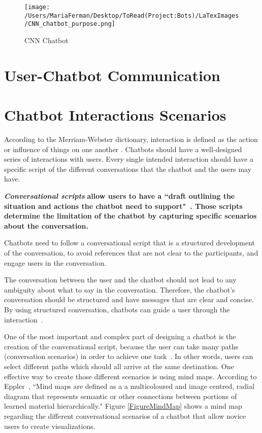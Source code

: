 \documentclass[a4paper,10pt]{article}
\begin{document}
\begin{figure}
\centering
\texttt{[image: /Users/MariaFerman/Desktop/ToRead(Project:Bots)/LaTexImages/CNN\_chatbot\_purpose.png]}
\caption{CNN Chatbot}
\label{FigurePurpose}
\end{figure}

\section*{User-Chatbot Communication}

\section{Chatbot Interactions Scenarios}

According to the Merriam-Webster dictionary, interaction is defined as the action or influence of things on one another \cite{merriam-webster}.
Chatbots should have a well-designed series of interactions with users. Every single intended interaction should have a specific script of the different conversations that the chatbot and the users may have. 

\textbf{\textit{Conversational scripts}} \textbf{allow users to have a ``draft outlining the situation and actions the chatbot need to support"~\cite{CaseStudy}. Those scripts determine the limitation of the chatbot by capturing specific scenarios about the conversation.} 

Chatbots need to follow a conversational script that is a structured development of the conversation, to avoid references that are not clear to the participants, and engage users in the conversation.

The conversation between the user and the chatbot should not lead to any ambiguity about what to say in the conversation. Therefore, the chatbot's conversation should be structured and have messages that are clear and concise. By using structured conversation, chatbots can guide a user through the interaction~\cite{HeuristicsWebPage}.


One of the most important and complex part of designing a chatbot is the creation of the conversational script, because the user can take many paths (conversation scenarios) in order to achieve one task~\cite{designChatbotConversatio}. In other words, users can select different paths which should all arrive at the same destination. One effective way to create those different scenarios is using mind maps. According to Eppler~\cite{eppler2006comparison}, ``Mind maps are defined as a a multicoloured and image centred, radial diagram that represents semantic or other connections between portions of learned material hierarchically." Figure \ref{FigureMindMap} shows a mind map regarding the different conversational scenarios of a chatbot that allow novice users to create visualizations. 
\end{document}
